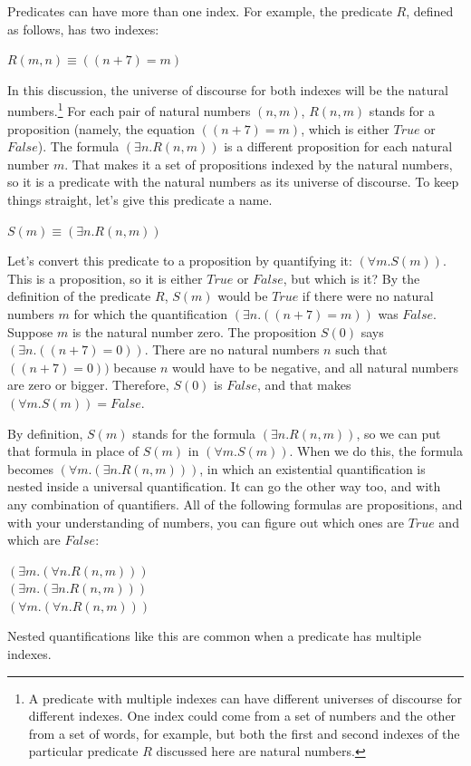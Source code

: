 {{Predicates can have more than one index.
For example, the predicate $R$,
defined as follows, has two indexes:
\begin{center}
$R(m, n) \equiv ((n + 7) = m)$
\end{center}
In this discussion, the universe of discourse
for both indexes will be the natural numbers.\footnote{A
predicate with multiple indexes can
have different universes of discourse for different indexes.
One index could come from a set of numbers
and the other from a set of words, for example,
but both the first and second indexes
of the particular predicate $R$ discussed here
are natural numbers.}
For each pair of natural numbers $(n, m)$,
$R(n, m)$ stands for a proposition (namely, the
equation $((n + 7) = m)$, which is either $True$ or $False$).
The formula $(\exists n.R(n,m))$ is a different
proposition for each natural number $m$.
That makes it a set of propositions indexed by the natural numbers,
so it is a predicate with the natural numbers as its universe of discourse.
To keep things straight, let's give this predicate a name.
\begin{center}
$S(m) \equiv (\exists n.R(n,m))$
\end{center}

Let's convert this predicate to a proposition by quantifying it:
$(\forall m.S(m))$. This is a proposition, so
it is either $True$ or $False$, but which is it?
By the definition of the predicate $R$,
$S(m)$ would be $True$ if there were no natural numbers $m$
for which the quantification $(\exists n.((n+7) = m))$ was $False$.
Suppose $m$ is the natural number zero.
The proposition $S(0)$ says $(\exists n.((n+7) = 0))$.
There are no natural numbers $n$ such that
$((n+7) = 0))$ because $n$ would have to be negative,
and all natural numbers are zero or bigger.
Therefore, $S(0)$ is $False$,
and that makes $(\forall m.S(m)) = False$.

By definition,
$S(m)$ stands for the formula $(\exists n.R(n,m))$,
so we can put that formula in place of $S(m)$
in $(\forall m.S(m))$. When we do this,
the formula becomes $(\forall m.(\exists n.R(n,m)))$,
in which an existential quantification
is nested inside a universal quantification.
It can go the other way too, and with any
combination of quantifiers.
All of the following formulas are propositions,
and with your understanding of numbers, you
can figure out which ones are $True$ and
which are $False$:
\begin{center}
$(\exists m.(\forall n.R(n,m)))$ \\
$(\exists m.(\exists n.R(n,m)))$ \\
$(\forall m.(\forall n.R(n,m)))$
\end{center}
Nested quantifications like this are common
when a predicate has multiple indexes.

}}
